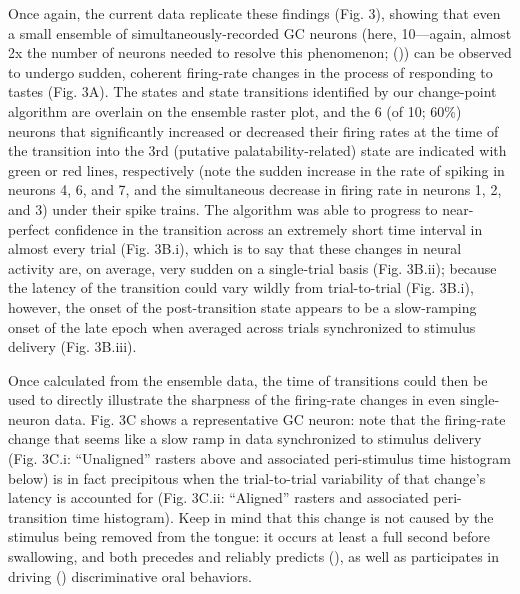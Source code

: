\begin{refsection}
Once again, the current data replicate these findings (Fig. 3), showing that even a small ensemble of simultaneously-recorded GC neurons (here, 10—again, almost 2x the number of neurons needed to resolve this phenomenon; (\cite{jones2007a})) can be observed to undergo sudden, coherent firing-rate changes in the process of responding to tastes (Fig. 3A). The states and state transitions identified by our change-point algorithm are overlain on the ensemble raster plot, and the 6 (of 10; 60\%) neurons that significantly increased or decreased their firing rates at the time of the transition into the 3rd (putative palatability-related) state are indicated with green or red lines, respectively (note the sudden increase in the rate of spiking in neurons 4, 6, and 7, and the simultaneous decrease in firing rate in neurons 1, 2, and 3) under their spike trains. The algorithm was able to progress to near-perfect confidence in the transition across an extremely short time interval in almost every trial (Fig. 3B.i), which is to say that these changes in neural activity are, on average, very sudden on a single-trial basis (Fig. 3B.ii); because the latency of the transition could vary wildly from trial-to-trial (Fig. 3B.i), however, the onset of the post-transition state appears to be a slow-ramping onset of the late epoch when averaged across trials synchronized to stimulus delivery (Fig. 3B.iii). 

Once calculated from the ensemble data, the time of transitions could then be used to directly illustrate the sharpness of the firing-rate changes in even single-neuron data. Fig. 3C shows a representative GC neuron: note that the firing-rate change that seems like a slow ramp in data synchronized to stimulus delivery (Fig. 3C.i: “Unaligned” rasters above and associated peri-stimulus time histogram below) is in fact precipitous when the trial-to-trial variability of that change’s latency is accounted for (Fig. 3C.ii: “Aligned” rasters and associated peri-transition time histogram). Keep in mind that this change is not caused by the stimulus being removed from the tongue: it occurs at least a full second before swallowing, and both precedes and reliably predicts (\cite{sadacca2016a}), as well as participates in driving (\cite{mukherjee2019a}) discriminative oral behaviors.


\end{refsection}
